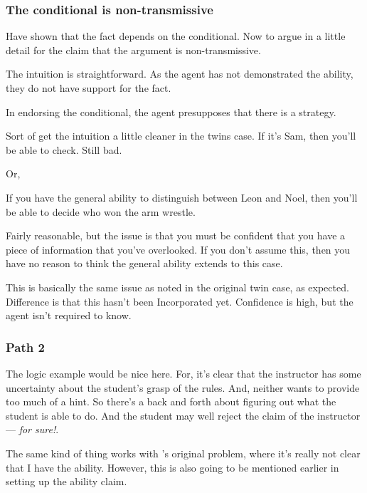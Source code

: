 \documentclass[10pt]{article}
\begin{document}
\newpage

\subsubsection{The conditional is non-transmissive}
\label{sec:argum-non-transm}

\begin{note}[Overview]
  Have shown that the fact depends on the conditional.
  Now to argue in a little detail for the claim that the argument is non-transmissive.
\end{note}

The intuition is straightforward.
As the agent has not demonstrated the ability, they do not have support for the fact.

In endorsing the conditional, the agent presupposes that there is a strategy.

Sort of get the intuition a little cleaner in the twins case.
If it's Sam, then you'll be able to check.
Still bad.

Or,

If you have the general ability to distinguish between Leon and Noel, then you'll be able to decide who won the arm wrestle.

Fairly reasonable, but the issue is that you must be confident that you have a piece of information that you've overlooked.
If you don't assume this, then you have no reason to think the general ability extends to this case.

This is basically the same issue as noted in the original twin case, as expected.
{
  \color{red}
  Difference is that this hasn't been Incorporated yet.
  Confidence is high, but the agent isn't required to know.
}

\subsubsection{Path 2}
\label{sec:path-2}

\begin{note}
  The logic example would be nice here.
  For, it's clear that the instructor has some uncertainty about the student's grasp of the rules.
  And, neither wants to provide too much of a hint.
  So there's a back and forth about figuring out what the student is able to do.
  And the student may well reject the claim of the instructor --- \emph{for sure!}.
\end{note}

\begin{note}
  The same kind of thing works with \cite{Emms:2000aa}'s original problem, where it's really not clear that I have the ability.
  However, this is also going to be mentioned earlier in setting up the ability claim.
\end{note}
\end{document}
